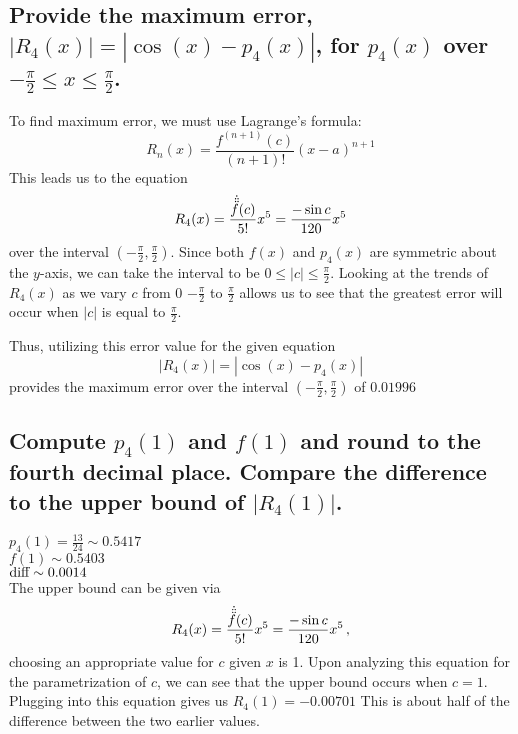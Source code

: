 \documentclass[12pt, letterpaper]{article}
\begin{document}
\subsection{Provide the maximum error, $|R_{4}{(x)}|=|\cos{(x)}-p_{4}{(x)}|$,
for $p_{4}{(x)}$ over $-\frac{\pi}{2}\leq x \leq \frac{\pi}{2}$.}
To find maximum error, we must use Lagrange's formula:
\begin{equation}
	R_{n}{(x)} = \frac{f^{(n+1)}{(c)}}{(n+1)!}{(x-a)}^{n+1}
\end{equation}
This leads us to the equation
\begin{equation}
	R_{4}{(x)}=\frac{\Dot{\Ddot{\Ddot{f}}}{(c)}}{5!}{x^{5}}=\frac{-\sin{c}}{120}x^{5}
\end{equation}
over the interval ${(-\frac{\pi}{2}, \frac{\pi}{2})}$.
Since both $f{(x)}$ and $p_4{(x)}$ are symmetric about the $y$-axis, we can
take the interval to be $0 \leq |c| \leq \frac{\pi}{2}$.
Looking at the trends of $R_4{(x)}$ as we vary $c$ from 0 $-\frac{\pi}{2}$ to
$\frac{\pi}{2}$ allows us to see that the greatest error will occur
when $|c|$ is equal to $\frac{\pi}{2}$. 

Thus, utilizing this error value for the given equation 
\begin{equation}
	|R_4{(x)}| = |\cos{(x)}-p_4{(x)}|
\end{equation}
provides the maximum error over the interval ${(-\frac{\pi}{2}, \frac{\pi}{2})}$
of  $0.01996$


\hfill\blacksquare%
\subsection{Compute $p_{4}{(1)}$ and $f{(1)}$ and round to the fourth decimal
place. Compare the difference to the upper bound of $|R_{4}{(1)}|$.}
$p_{4}{(1)}=\frac{13}{24} \sim 0.5417$\\
$f{(1)}\sim 0.5403$\\
$\textup{diff}\sim 0.0014$\\
The upper bound can be given via 
\begin{equation}
	R_{4}{(x)}=\frac{\Dot{\Ddot{\Ddot{f}}}{(c)}}{5!}{x^{5}}=\frac{-\sin{c}}{120}x^{5}\,,
\end{equation}
choosing an appropriate value for $c$ given $x$ is 1.
Upon analyzing this equation for the parametrization of $c$, we can see that
the upper bound occurs when $c=1$.
Plugging into this equation gives us $R_{4}{(1)}=-0.00701$
This is about half of the difference between the two earlier values.
\end{document}
